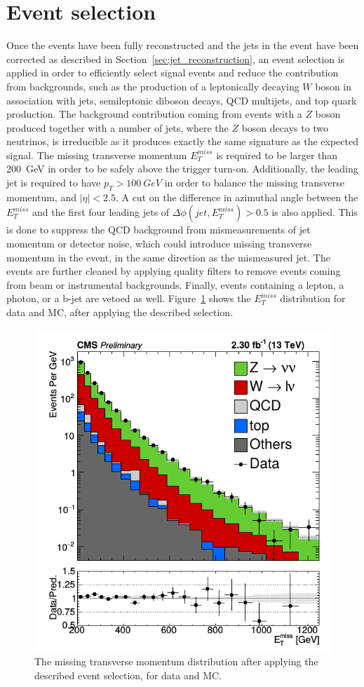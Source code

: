 \section{Event selection}
\label{sec:selection}

Once the events have been fully reconstructed and the jets in the event have been corrected as described in Section~\ref{sec:jet_reconstruction}, an event selection is applied in order to efficiently select signal events and reduce the contribution from backgrounds, such as the production of a leptonically decaying $W$ boson in association with jets, semileptonic diboson decays, QCD multijets, and top quark production. The background contribution coming from events with a $Z$ boson produced together with a number of jets, where the $Z$ boson decays to two neutrinos, is irreducible as it produces exactly the same signature as the expected signal. The missing transverse momentum $E_T^{miss}$ is required to be larger than \SI{200}{GeV} in order to be safely above the trigger turn-on. Additionally, the leading jet is required to have $p_T > \SI{100}{GeV}$ in order to balance the missing transverse momentum, and $|\eta| < 2.5$. A cut on the difference in azimuthal angle between the $E_T^{miss}$ and the first four leading jets of $\Delta\phi(jet, E_T^{miss}) > 0.5$ is also applied. This is done to suppress the QCD background from mismeasurements of jet momentum or detector noise, which could introduce missing transverse momentum in the event, in the same direction as the mismeasured jet. The events are further cleaned by applying quality filters to remove events coming from beam or instrumental backgrounds. Finally, events containing a lepton, a photon, or a b-jet are vetoed as well. Figure~\ref{fig:MET} shows the $E_T^{miss}$ distribution for data and MC, after applying the described selection.

\begin{figure}[ht]
  \centering
 \includegraphics[width=.6\textwidth]{MET.png} 
 \caption{The missing transverse momentum distribution after applying the described event selection, for data and MC.}
 \label{fig:MET}
\end{figure}


